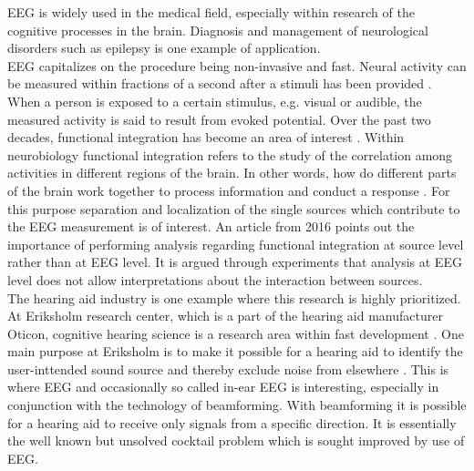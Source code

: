 \noindent
EEG is widely used in the medical field, especially within research of the cognitive processes in the brain. 
Diagnosis and management of neurological disorders such as epilepsy is one example of application.
\\
EEG capitalizes on the procedure being non-invasive and fast.
Neural activity can be measured within fractions of a second after a stimuli has been provided \cite[p. 3]{fundamentalEEG}. 
When a person is exposed to a certain stimulus, e.g. visual or audible, the measured activity is said to result from evoked potential.
Over the past two decades, functional integration has become an area of interest \cite{Friston2011}. 
Within neurobiology functional integration refers to the study of the correlation among activities in different regions of the brain. 
In other words, how do different parts of the brain work together to process information and conduct a response \cite{Friston2002}.     
For this purpose separation and localization of the single sources which contribute to the EEG measurement is of interest. 
An article from 2016 \cite{Van2019} points out the importance of performing analysis regarding functional integration at source level rather than at EEG level. 
It is argued through experiments that analysis at EEG level does not allow interpretations about the interaction between sources.  
\\ 
The hearing aid industry is one example where this research is highly prioritized. 
At Eriksholm research center, which is a part of the hearing aid manufacturer Oticon, cognitive hearing science is a research area within fast development \cite{Weberik}. 
One main purpose at Eriksholm is to make it possible for a hearing aid to identify the user-inttended sound source and thereby exclude noise from elsewhere \cite{Emina2019} \cite{Bech2018}. 
This is where EEG and occasionally so called in-ear EEG is interesting, especially in conjunction with the technology of beamforming. With beamforming it is possible for a hearing aid to receive only signals from a specific direction. 
It is essentially the well known but unsolved cocktail problem which is sought improved by use of EEG. 


